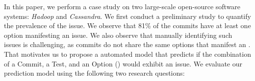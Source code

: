 

In this paper, we perform a case study on two large-scale open-source software systems: \emph{Hadoop} and \emph{Cassandra}. We first conduct a preliminary study to quantify the prevalence of the \inconsistent issue. We observe that 81\% of the commits have at least one option manifesting an \inconsistent issue. We also observe that manually identifying such issues is challenging, as commits do not share the same options that manifest an \inconsistent. That motivates us to propose a automated model that predicts if the combination of a Commit, a Test, and an Option (\textbf{\instance}) would exhibit an \inconsistent issue. We evaluate our prediction model using the following two research questions: 



